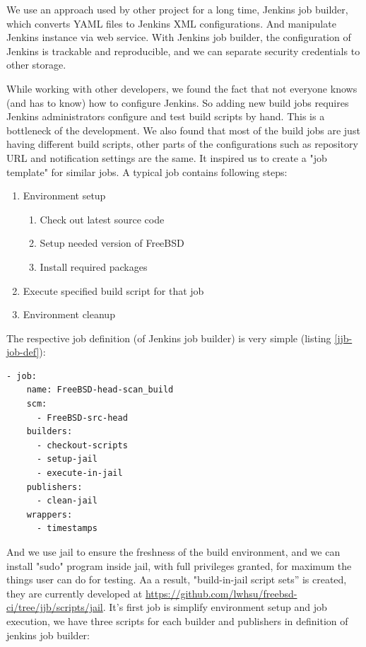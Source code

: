 \documentclass[a4paper,twocolumn,10pt]{article}
\begin{document}
We use an approach used by other project for a long time, Jenkins job builder,
which converts YAML files to Jenkins XML configurations. And manipulate Jenkins
instance via web service. With Jenkins job builder, the configuration of
Jenkins is trackable and reproducible, and we can separate security credentials
to other storage.

While working with other developers, we found the fact that not everyone knows
(and has to know) how to configure Jenkins. So adding new build jobs requires
Jenkins administrators configure and test build scripts by hand. This is a
bottleneck of the development. We also found that most of the build jobs are
just having different build scripts, other parts of the configurations such as
repository URL and notification settings are the same. It inspired us to create
a "job template" for similar jobs. A typical job contains following steps:

\begin{enumerate}
\item Environment setup
  \begin{enumerate}
  \item Check out latest source code
  \item Setup needed version of FreeBSD
  \item Install required packages
  \end{enumerate}
\item Execute specified build script for that job
\item Environment cleanup
\end{enumerate}

The respective job definition (of Jenkins job builder) is very simple
(listing \ref{jjb-job-def}):

\begin{lstlisting}[captionpos=b,caption=Job definition,label=jjb-job-def]
- job:
    name: FreeBSD-head-scan_build
    scm:
      - FreeBSD-src-head
    builders:
      - checkout-scripts
      - setup-jail
      - execute-in-jail
    publishers:
      - clean-jail
    wrappers:
      - timestamps
\end{lstlisting}

And we use jail to ensure the freshness of the build environment, and we can
install "sudo" program inside jail, with full privileges granted, for maximum
the things user can do for testing. Aa a result, "build-in-jail script sets” is
created, they are currently developed at
\url{https://github.com/lwhsu/freebsd-ci/tree/jjb/scripts/jail}. It’s first job
is simplify environment setup and job execution, we have three scripts for each
builder and publishers in definition of jenkins job builder:
\end{document}
